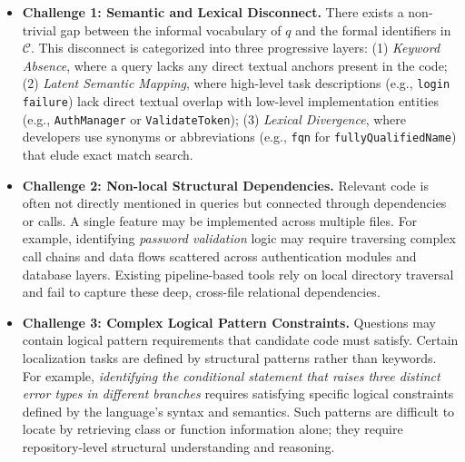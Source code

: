 \begin{itemize}[leftmargin=*]
    \item \textbf{Challenge 1: Semantic and Lexical Disconnect.} There exists a non-trivial gap between the informal vocabulary of $q$ and the formal identifiers in $\mathcal{C}$. This disconnect is categorized into three progressive layers: (1) \textit{Keyword Absence}, where a query lacks any direct textual anchors present in the code; (2) \textit{Latent Semantic Mapping}, where high-level task descriptions (e.g., \texttt{login failure}) lack direct textual overlap with low-level implementation entities (e.g., \texttt{AuthManager} or \texttt{ValidateToken}); (3) \textit{Lexical Divergence}, where developers use synonyms or abbreviations (e.g., \texttt{fqn} for \texttt{fullyQualifiedName}) that elude exact match search.

    \item \textbf{Challenge 2: Non-local Structural Dependencies.} Relevant code is often not directly mentioned in queries but connected through dependencies or calls. A single feature may be implemented across multiple files. For example, identifying \textit{password validation} logic may require traversing complex call chains and data flows scattered across authentication modules and database layers. Existing pipeline-based tools rely on local directory traversal and fail to capture these deep, cross-file relational dependencies.

    \item \textbf{Challenge 3: Complex Logical Pattern Constraints.} Questions may contain logical pattern requirements that candidate code must satisfy. Certain localization tasks are defined by structural patterns rather than keywords. For example, \textit{identifying the conditional statement that raises three distinct error types in different branches} requires satisfying specific logical constraints defined by the language's syntax and semantics. Such patterns are difficult to locate by retrieving class or function information alone; they require repository-level structural understanding and reasoning.
\end{itemize}

